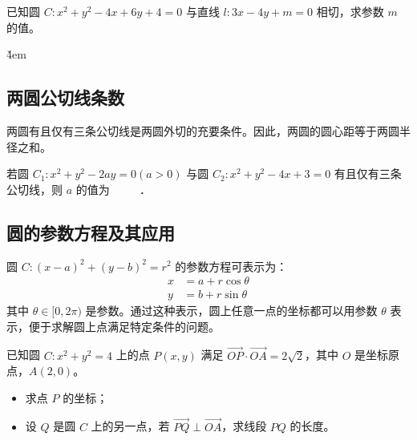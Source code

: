 \begin{example}
    已知圆 $C: x^2+y^2-4x+6y+4=0$ 与直线 $l: 3x-4y+m=0$ 相切，求参数 $m$ 的值。
\end{example}

\v{4em}

\subsection{两圆公切线条数}

\begin{theorem}[两圆公切线条数]
    两圆有且仅有三条公切线是两圆外切的充要条件。因此，两圆的圆心距等于两圆半径之和。
\end{theorem}
\begin{example}
    若圆 $C_1: x^2+y^2-2 a y=0(a>0)$ 与圆 $C_2: x^2+y^2-4 x+3=0$ 有且仅有三条公切线，则 $a$ 的值为 $\qquad$ ．
\end{example}

\vspace{4em}

\subsection{圆的参数方程及其应用}

\begin{theorem}[圆的参数方程]
    圆 $C: (x-a)^2+(y-b)^2=r^2$ 的参数方程可表示为：
    \begin{align*}
        x & = a + r\cos\theta \\
        y & = b + r\sin\theta
    \end{align*}
    其中 $\theta \in [0, 2\pi)$ 是参数。通过这种表示，圆上任意一点的坐标都可以用参数 $\theta$ 表示，便于求解圆上点满足特定条件的问题。
\end{theorem}

\begin{example}
    已知圆 $C: x^2+y^2=4$ 上的点 $P(x,y)$ 满足 $\overrightarrow{OP} \cdot \overrightarrow{OA} = 2\sqrt{2}$，其中 $O$ 是坐标原点，$A(2,0)$。
    \begin{itemize}
        \item[(1)] 求点 $P$ 的坐标；
        \item[(2)] 设 $Q$ 是圆 $C$ 上的另一点，若 $\overrightarrow{PQ} \perp \overrightarrow{OA}$，求线段 $PQ$ 的长度。
    \end{itemize}
\end{example}

\vspace{4em}

